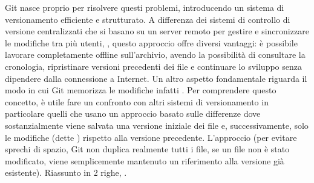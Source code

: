 Git nasce proprio per risolvere questi problemi, introducendo un sistema di versionamento efficiente e strutturato. A differenza dei sistemi di controllo di versione centralizzati che si basano su un server remoto per gestire e sincronizzare le modifiche tra più utenti, , questo approccio offre diversi vantaggi: è possibile lavorare completamente offline sull'archivio, avendo la possibilità di consultare la cronologia, ripristinare versioni precedenti dei file e continuare lo sviluppo senza dipendere dalla connessione a Internet. Un altro aspetto fondamentale riguarda il modo in cui Git memorizza le modifiche infatti . Per comprendere questo concetto, è utile fare un confronto con altri sistemi di versionamento in particolare quelli che usano un approccio basato sulle differenze dove sostanzialmente viene salvata una versione iniziale dei file e, successivamente, solo le modifiche (dette ) rispetto alla versione precedente. L'approccio  (per evitare sprechi di spazio, Git non duplica realmente tutti i file, se un file non è stato modificato, viene semplicemente mantenuto un riferimento alla versione già esistente). Riassunto in 2 righe, .

